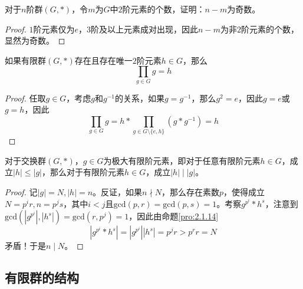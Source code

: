 \begin{proposition}
	对于$n$阶群$(G,*)$，令$m$为$G$中$2$阶元素的个数，证明：$n-m$为奇数。
\end{proposition}

\begin{proof}
	$1$阶元素仅为$e$，$3$阶及以上元素成对出现，因此$n-m$为非$2$阶元素的个数，显然为奇数。
\end{proof}

\begin{proposition}
	如果有限群$(G,*)$存在且存在唯一$2$阶元素$h\in G$，那么
	$$
	\prod_{g\in G}g=h
	$$
\end{proposition}

\begin{proof}
	任取$g\in G$，考虑$g$和$g^{-1}$的关系，如果$g=g^{-1}$，那么$g^2=e$，因此$g=e$或$g=h$，因此
	$$
	\prod_{g\in G}g=h*\prod_{g\in G\setminus\{e,h\}}(g*g^{-1})=h
	$$
\end{proof}

\begin{proposition}
	对于交换群$(G,*)$，$g\in G$为极大有限阶元素，即对于任意有限阶元素$h\in G$，成立$|h|\le |g|$，那么对于有限阶元素$h\in G$，成立$|h|\mid |g|$。
\end{proposition}

\begin{proof}
	记$|g|=N,|h|=n$。反证，如果$n\nmid N$，那么存在素数$p$，使得成立$N=p^ir,n=p^js$，其中$i<j$且$\mathrm{gcd}(p,r)=\mathrm{gcd}(p,s)=1$。考察$g^{p^i}*h^s$，注意到$\mathrm{gcd}(|g^{p^i}|,|h^s|)=\mathrm{gcd}(r,p^j)=1$，因此由命题\ref{pro:2.1.14}
	$$
	\left| g^{p^i}*h^s \right|=| g^{p^i} || h^s |=p^jr>p^rr=N
	$$
	矛盾！于是$n\mid N$。
\end{proof}

\subsection{有限群的结构}

\begin{table}[H]
	\centering
	\caption{有限群的结构}
	\renewcommand{\arraystretch}{1.5}
\end{table}

